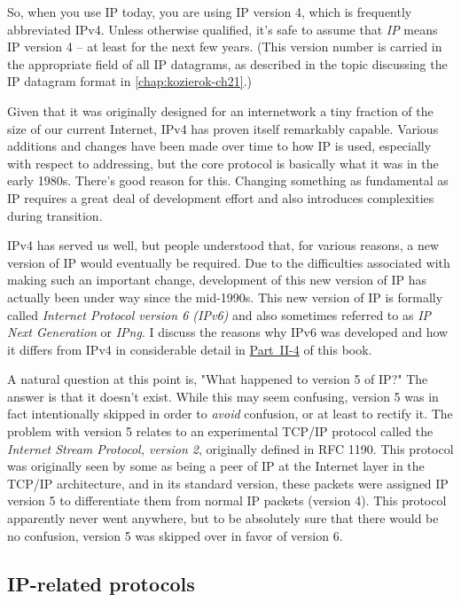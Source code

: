 \documentclass[b5paper,11pt]{memoir}
\begin{document}
So, when you use IP today, you are using IP version 4, which is
frequently abbreviated IPv4. Unless otherwise qualified, it's safe to
assume that {\emph{IP}} means IP version 4 -- at least for the next few years.
(This version number is carried in the appropriate field of all IP datagrams, as described in the topic discussing the IP datagram format in \vref{chap:kozierok-ch21}.)

Given that it was originally designed for an internetwork a tiny
fraction of the size of our current Internet, IPv4 has proven itself remarkably capable.
Various additions and changes have been made over
time to how IP is used, especially with respect to addressing, but the
core protocol is basically what it was in the early 1980s. There's good
reason for this. Changing something as fundamental as IP requires a
great deal of development effort and also introduces complexities during
transition.

IPv4 has served us well, but people understood that, for various
reasons, a new version of IP would eventually be required. Due to the
difficulties associated with making such an important change,
development of this new version of IP has actually been under way since
the mid-1990s. This new version of IP is formally called {\emph{Internet
Protocol version 6 (IPv6)}} and also sometimes referred to as {\emph{IP
Next Generation}} or {\emph{IPng}}. I discuss the reasons why IPv6 was
developed and how it differs from IPv4 in considerable detail in
\protect\hyperlink{pt07.html}{Part~II-4} of this book.

A natural question at this point is, "What happened to version 5 of IP?"
The answer is that it doesn't exist. While this may seem confusing,
version 5 was in fact intentionally skipped in order to {\emph{avoid}}
confusion, or at least to rectify it. The problem with version 5 relates
to an experimental TCP/IP protocol called the {\emph{Internet Stream
Protocol, version 2}}, originally defined in RFC 1190. This protocol was
originally seen by some as being a peer of IP at the Internet layer in
the TCP/IP architecture, and in its standard version, these packets were
assigned IP version 5 to differentiate them from normal IP packets
(version 4). This protocol apparently never went anywhere, but to be
absolutely sure that there would be no confusion, version 5 was skipped
over in favor of version 6.




\subsection{IP-related protocols}
\end{document}
